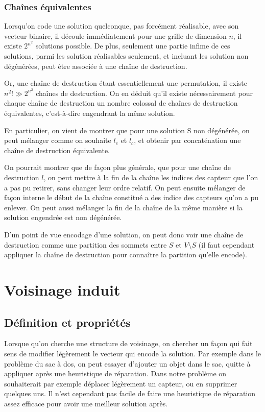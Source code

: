 \documentclass[12pt,a4paper]{article}
\begin{document}
\subsubsection{Chaînes équivalentes}
Lorsqu'on code une solution quelconque, pas forcément réalisable, avec son vecteur binaire, il découle immédiatement pour une grille de dimension $n$, il existe $2^{n^2}$ solutions possible. De plus, seulement une partie infime de ces solutions, parmi les solution réalisables seulement, et incluant les solution non dégénérées, peut être associée à une chaîne de destruction.

Or, une chaîne de destruction étant essentiellement une permutation, il existe $n^2!\gg 2^{n^2}$ chaînes de destruction. On en déduit qu'il existe nécessairement pour chaque chaîne de destruction un nombre colossal de chaînes de destruction équivalentes, c'est-à-dire engendrant la même solution.

En particulier, on vient de montrer que pour une solution S non dégénérée, on peut mélanger comme on souhaite $l_e$ et $l_c$, et obtenir par concaténation une chaîne de destruction équivalente.

On pourrait montrer que de façon plus générale, que pour une chaîne de destruction $l$, on peut mettre à la fin de la chaîne les indices des capteur que l'on a pas pu retirer, sans changer leur ordre relatif. On peut ensuite mélanger de façon interne le début de la chaîne constitué a des indice des capteurs qu'on a pu enlever. On peut aussi mélanger la fin de la chaîne de la même manière si la solution engendrée est non dégénérée.

D'un point de vue encodage d'une solution, on peut donc voir une chaîne de destruction comme une partition des sommets entre $S$ et $V\setminus S$ (il faut cependant appliquer la chaîne de destruction pour connaître la partition qu'elle encode).

\section{Voisinage induit}
\subsection{Définition et propriétés}
Lorsque qu'on cherche une structure de voisinage, on chercher un façon qui fait sens de modifier légèrement le vecteur qui encode la solution. Par exemple dans le problème du sac à dos, on peut essayer d'ajouter un objet dans le sac, quitte à appliquer après une heuristique de réparation. Dans notre problème on souhaiterait par exemple déplacer légèrement un capteur, ou en supprimer quelques uns. Il n'est cependant pas facile de faire une heuristique de réparation assez efficace pour avoir une meilleur solution après.
\end{document}
